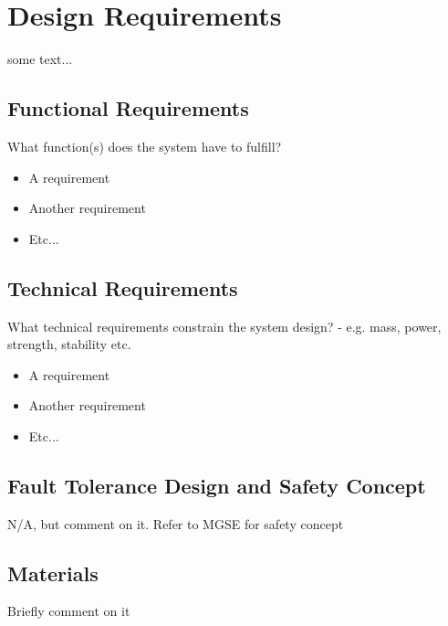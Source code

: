 \chapter{Design Requirements}
\label{chap:requirements}

some text...

\section{Functional Requirements}

What function(s) does the system have to fulfill?

\begin{itemize}
\item A requirement
\item Another requirement
\item Etc...
\end{itemize}


\section{Technical Requirements}

What technical requirements constrain the system design? - e.g. mass, power, strength, stability etc.

\begin{itemize}
\item A requirement
\item Another requirement
\item Etc...
\end{itemize}

\section{Fault Tolerance Design and Safety Concept}

N/A, but comment on it. Refer to MGSE for safety concept

\section{Materials}

Briefly comment on it
